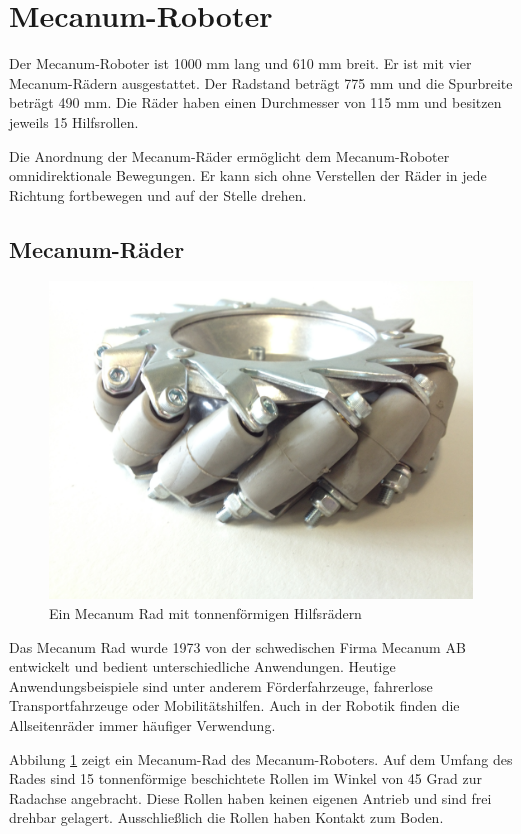 \section{Mecanum-Roboter}
\label{sec:Mecanum-Roboter}

Der Mecanum-Roboter ist 1000 mm lang und 610 mm breit. Er ist mit vier Mecanum-Rädern ausgestattet. Der Radstand beträgt 775 mm und die Spurbreite beträgt 490 mm. Die Räder haben einen Durchmesser von 115 mm und besitzen jeweils 15 Hilfsrollen.

Die Anordnung der Mecanum-Räder ermöglicht dem Mecanum-Roboter omnidirektionale Bewegungen.
Er kann sich ohne Verstellen der Räder in jede Richtung fortbewegen und auf der Stelle drehen.

\subsection*{Mecanum-Räder}
\label{sec:Mecanum-Raeder}
\begin{figure}
\centering
 \includegraphics[width=.6\textwidth]{Abbildungen/Mecanumrad} 
\caption[Mecanum-Rad]{Ein Mecanum Rad mit tonnenförmigen Hilfsrädern}
\label{fig:Mecanum-Rad}
\end{figure}
Das Mecanum Rad wurde 1973 von der schwedischen Firma Mecanum AB entwickelt und bedient unterschiedliche Anwendungen. Heutige Anwendungsbeispiele sind unter anderem Förderfahrzeuge, fahrerlose Transportfahrzeuge oder Mobilitätshilfen. Auch in der Robotik finden die Allseitenräder immer häufiger Verwendung.

Abbilung \ref{fig:Mecanum-Rad} zeigt ein Mecanum-Rad des Mecanum-Roboters. Auf dem Umfang des Rades sind 15 tonnenförmige beschichtete Rollen im Winkel von 45 Grad zur Radachse angebracht. Diese Rollen haben keinen eigenen Antrieb und sind frei drehbar gelagert. Ausschließlich die Rollen haben Kontakt zum Boden.

